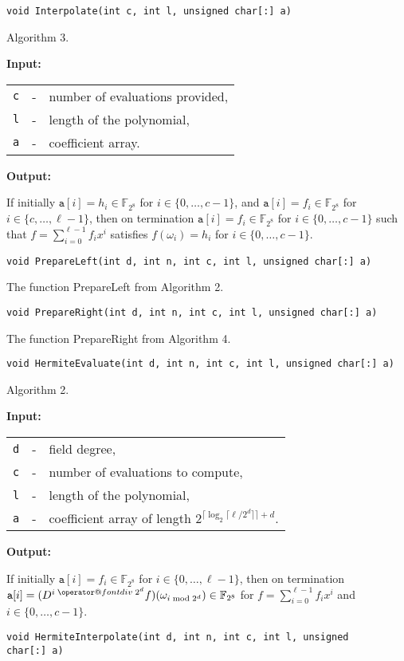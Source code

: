 \documentclass{amsart}
\makeatletter
\newcommand{\F}{\mathbb{F}}
\newcommand{\Input}{\textbf{Input:}}
\newcommand{\Output}{\textbf{Output:}}
\newcommand*{\bdiv}{%
	\nonscript\mskip-\medmuskip\mkern5mu%
	\mathbin{\operator@font div}\penalty900\mkern5mu%
	\nonscript\mskip-\medmuskip
}
\newenvironment{inputs}{\Input\par\begin{tabular}{@{}rcl}}{\end{tabular}}
\newenvironment{outputs}{\Output\par}{}
\makeatother
\begin{document}
\texttt{void Interpolate(int c, int l, unsigned char[:]\ a)}

Algorithm 3.

\begin{inputs}
	\texttt{c} & - & number of evaluations provided, \\
	\texttt{l} & - & length of the polynomial,       \\
	\texttt{a} & - & coefficient array.
\end{inputs}

\begin{outputs}
	If initially $\texttt{a}[i]=h_i\in\F_{2^8}$ for $i\in\{0,\dotsc,c-1\}$, and
	$\texttt{a}[i]=f_i\in\F_{2^8}$ for $i\in\{c,\dotsc,\ell-1\}$, then on
	termination $\texttt{a}[i]=f_i\in\F_{2^8}$ for $i\in\{0,\dotsc,c-1\}$ such that
	$f=\sum^{\ell-1}_{i=0}f_ix^i$ satisfies $f(\omega_i)=h_i$ for
	$i\in\{0,\dotsc,c-1\}$.
\end{outputs}

\texttt{void PrepareLeft(int d, int n, int c, int l, unsigned char[:]\ a)}

The function \textsf{PrepareLeft} from Algorithm 2.

\texttt{void PrepareRight(int d, int n, int c, int l, unsigned char[:]\ a)}

The function \textsf{PrepareRight} from Algorithm 4.

\texttt{void HermiteEvaluate(int d, int n, int c, int l, unsigned char[:]\ a)}

Algorithm 2.

\begin{inputs}
	\texttt{d} & - & field degree,                     \\
	\texttt{c} & - & number of evaluations to compute, \\
	\texttt{l} & - & length of the polynomial,         \\
	\texttt{a} & - & coefficient array of length
	$2^{\lceil\log_2\lceil\ell/2^d\rceil\rceil+d}$.
\end{inputs}

\begin{outputs}
	If initially $\texttt{a}[i]=f_i\in\F_{2^8}$ for $i\in\{0,\dotsc,\ell-1\}$, then
	on termination
	$\texttt{a}[i]=(D^{i\bdiv{2^d}}f)(\omega_{i\bmod{2^d}})\in\F_{2^8}$ for
	$f=\sum^{\ell-1}_{i=0}f_ix^i$ and $i\in\{0,\dotsc,c-1\}$.
\end{outputs}

\texttt{void HermiteInterpolate(int d, int n, int c, int l, unsigned char[:]\
	a)}
\end{document}
